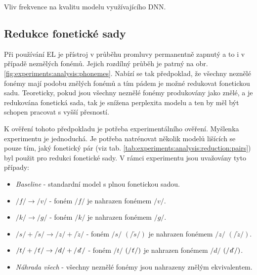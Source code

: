 \begin{table}[htpb]
  \centering
  \def\arraystretch{1.5}
  \caption{Vliv frekvence na kvalitu modelu využívajícího DNN.}
  \label{tab:experiments:analysis:experiment:dnn}
\end{table}

\subsection{Redukce fonetické sady}
\label{chap:experiments:analysis:reduction}

Při používání EL je přístroj v průběhu promluvy permanentně zapnutý a to i v případě neznělých fonémů. Jejich rozdílný průběh je patrný na obr. \ref{fig:experiments:analysis:phonemes}. Nabízí se tak předpoklad, že všechny neznělé fonémy mají podobu znělých fonémů a tím pádem je možné redukovat fonetickou sadu. Teoreticky, pokud jsou všechny neznělé fonémy produkovány jako znělé, a je redukována fonetická sada, tak je snížena perplexita modelu a ten by měl být schopen pracovat s vyšší přesností.

K ověření tohoto předpokladu je potřeba experimentálního ověření. Myšlenka experimentu je jednoduchá. Je potřeba natrénovat několik modelů lišících se pouze tím, jaký fonetický pár (viz tab. \ref{tab:experiments:analysis:reduction:pairs}) byl použit pro redukci fonetické sady. V rámci experimentu jsou uvažovány tyto případy:

\begin{itemize}
  \item \textit{Baseline} - standardní model s plnou fonetickou sadou.
  \item $/f/ \rightarrow /v/$ - foném $/f/$ je nahrazen fonémem $/v/$.
  \item $/k/ \rightarrow /g/$ - foném $/k/$ je nahrazen fonémem $/g/$.
  \item $/s/+/\check{s}/ \rightarrow /z/+/\check{z}/$ - foném $/s/$ $\left(/\check{s}/\right)$ je nahrazen fonémem $/z/$ $\left(/\check{z}/\right)$.
  \item $/t/+/\text{\textit{ť}}/ \rightarrow /d/+/\text{\textit{ď}}/$ - foném $/t/$ $\left(/\text{\textit{ť}}/\right)$ je nahrazen fonémem $/d/$ $\left(/\text{\textit{ď}}/\right)$.
  \item \textit{Náhrada všech} - všechny neznělé fonémy jsou nahrazeny znělým ekvivalentem.
\end{itemize}

